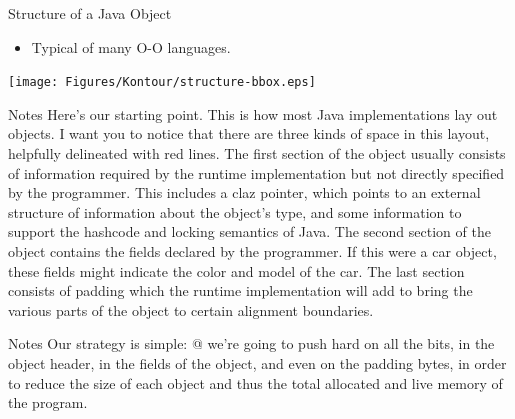 \documentclass[%
pdf,
colorBG,
slideColor,
nototal,
oqe
]{prosper}
\newenvironment{talknotes}{\begin{slide}{Notes}\tiny}{\end{slide}}
\begin{document}
\begin{slide}{Structure of a Java Object}
\begin{itemize}
\item Typical of many O-O languages.
\end{itemize}
\begin{center}
\texttt{[image: Figures/Kontour/structure-bbox.eps]}
\end{center}
\end{slide}

\begin{talknotes}
Here's our starting point.  This is how most Java implementations lay
out objects.  I want you to notice that there are three kinds of space
in this layout, helpfully delineated with red lines.  The first
section of the object usually consists of information required by
the runtime implementation but not directly specified by the
programmer.  This includes a claz pointer, which points to an
external structure of information about the object's type, and
some information to support the hashcode and locking semantics of
Java.  %
The second section of the object contains the fields declared by
the programmer.  If this were a car object, these fields might
indicate the color and model of the car.  The last section
consists of padding which the runtime implementation will
add to bring the various parts of the object to certain alignment
boundaries.
\end{talknotes}


\begin{talknotes}
Our strategy is simple: @ we're going to push hard on all the bits,
in the object header, in the fields of the object, and even on the
padding bytes, in order to reduce the size of each object and thus
the total allocated and live memory of the program.
\end{talknotes}
\end{document}
